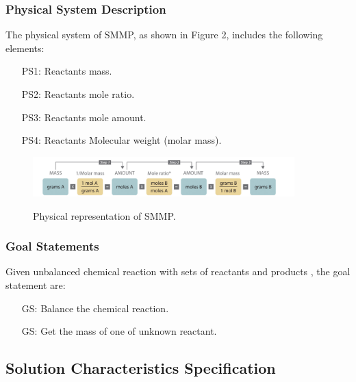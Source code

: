 \documentclass[12pt]{article}
\newcounter{goalnum} %
\begin{document}
\subsubsection{Physical System Description} \label{sec_phySystDescrip}

The physical system of SMMP, as shown in Figure 2,
includes the following elements:

\begin{itemize}

\item[PS1:] Reactants mass.\\
\item[PS2:] Reactants mole ratio.\\
\item[PS3:] Reactants mole amount.\\
\item[PS4:] Reactants Molecular weight (molar mass).\\

\end{itemize}

 \begin{figure}[h!]
 \begin{center}
 {
  \includegraphics[width=0.9\textwidth]{physical}
 }
 \caption{\label{ Figure 2:} Physical representation of SMMP.}
 \end{center}
 \end{figure}

\subsubsection{Goal Statements}

\noindent Given unbalanced chemical reaction with sets of reactants and products , the goal statement are:

\begin{itemize}
\item[GS\refstepcounter{goalnum}\thegoalnum \label{G1}:] Balance the chemical reaction.
\item[GS\refstepcounter{goalnum}\thegoalnum \label{G2}:] Get the mass of one of unknown reactant.
\end{itemize}

\subsection{Solution Characteristics Specification}
\end{document}
